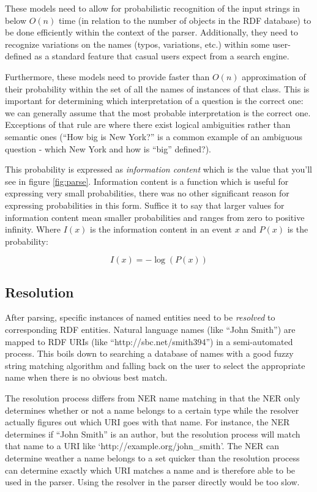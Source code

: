 \documentclass[11pt]{article}
\begin{document}
{These models need to allow for probabilistic recognition of the input strings in 
below $O(n)$ time (in relation to the number of objects in the RDF
database) to be done efficiently within the context of the parser. 
Additionally, they need to recognize variations on
the names (typos, variations, etc.) within some user-defined as a standard feature
that casual users expect from a search engine.

Furthermore, these models need to provide faster than $O(n)$
approximation of their probability within the set of all the names of instances
of that class. This is important for determining which interpretation of a
question is the correct one: we can generally assume that the most probable
interpretation is the correct one. Exceptions of that rule are where there exist
logical ambiguities rather than semantic ones (``How big is New York?'' is a common example
of an ambiguous question - which New York and how is ``big'' defined?). 

This probability is expressed as {\em information content}\cite{shannon} which is
the value that you'll see in figure \ref{fig:parse}. 
Information content is a function which is useful for expressing very small 
probabilities, there was no other significant reason for expressing
probabilities in this form. Suffice it to say that larger values for information content
mean smaller probabilities and ranges from zero to positive infinity. 
Where $I(x)$ is the information content in an event
$x$ and $P(x)$ is the probability:

\[ I(x) = -\log(P(x)) \]

\subsection{Resolution}
\label{resolution}
After parsing, specific instances of named entities need to be {\em resolved} to
corresponding RDF entities. Natural language names (like ``John Smith'') are mapped
to RDF URIs (like ``http://sbc.net/smith394'')
in a semi-automated process. This boils down to searching a
database of names with a good fuzzy string matching algorithm and falling
back on the user to select the appropriate name when there is no obvious best 
match.

The resolution process differs from NER name matching in that the NER 
only determines whether or not a name belongs to a certain type while the
resolver actually figures out which URI goes with that name. For instance, the NER
determines if ``John Smith'' is an author, but the resolution process will match that
name to a URI like `http://example.org/john\_smith'. The NER can determine weather
a name belongs to a set quicker than the resolution process can determine exactly
which URI matches a name and is therefore able to be used in the parser. Using the
resolver in the parser directly would be too slow.

}
\end{document}
